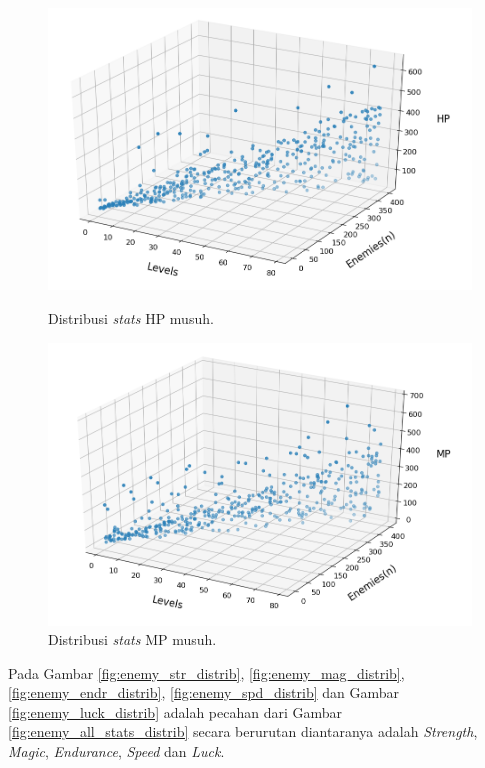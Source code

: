 \begin{figure} [!h]
\begin{minipage}[t]{1.0\linewidth}
	\centering
	\includegraphics[scale=0.58]{img/EnemyHpDistrib.png}
	\caption{Distribusi \textit{stats} HP musuh.}
	\label{fig:enemy_hp_distrib}
	\vspace{2ex}
\end{minipage}
\vfill
\begin{minipage}[t]{1.0\linewidth}
	\centering
	\includegraphics[scale=0.58]{img/EnemyMpDistrib.png}
	\caption{Distribusi \textit{stats} MP musuh.}
	\label{fig:enemy_mp_distrib}
\end{minipage} 
\end{figure}
\vspace{1ex}

Pada Gambar \ref{fig:enemy_str_distrib}, \ref{fig:enemy_mag_distrib}, \ref{fig:enemy_endr_distrib}, \ref{fig:enemy_spd_distrib} dan Gambar \ref{fig:enemy_luck_distrib} adalah pecahan dari Gambar \ref{fig:enemy_all_stats_distrib} secara berurutan diantaranya adalah \textit{Strength}, \textit{Magic}, \textit{Endurance}, \textit{Speed} dan \textit{Luck}.

